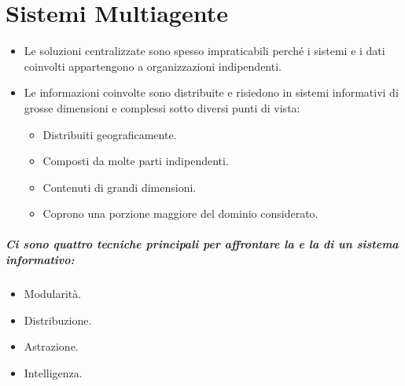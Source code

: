 \chapter{Sistemi Multiagente}


\begin{itemize}
  \item Le soluzioni centralizzate sono spesso impraticabili perché i sistemi e i dati coinvolti appartengono a organizzazioni indipendenti. 
  \item Le informazioni coinvolte sono distribuite e risiedono in sistemi informativi di grosse dimensioni e complessi sotto diversi punti di vista:
    \begin{itemize}
      \item Distribuiti geograficamente.
      \item Composti da molte parti indipendenti. 
      \item Contenuti di grandi dimensioni. 
      \item Coprono una porzione maggiore del dominio considerato.
    \end{itemize}
\end{itemize}

\paragraph{Ci sono quattro tecniche principali per affrontare la  e la  di un sistema informativo:}

\begin{itemize}
  \item Modularità. 
  \item Distribuzione. 
  \item Astrazione. 
  \item Intelligenza.
\end{itemize}



